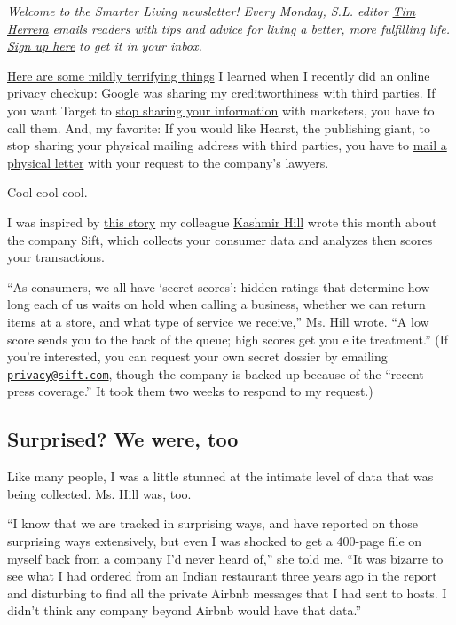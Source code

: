 \emph{Welcome to the Smarter Living newsletter! Every Monday, S.L.
editor} \href{https://twitter.com/timherrera}{\emph{Tim Herrera}}
\emph{emails readers with tips and advice for living a better, more
fulfilling life.}
\href{https://www.nytimes.com/newsletters/smarter-living?module=inline}{\emph{Sign
up here}} \emph{to get it in your inbox.}

\href{https://twitter.com/TimHerrera/status/1195067771463360512}{Here
are some mildly terrifying things} I learned when I recently did an
online privacy checkup: Google was sharing my creditworthiness with
third parties. If you want Target to
\href{https://twitter.com/TimHerrera/status/1195075728859156481}{stop
sharing your information} with marketers, you have to call them. And, my
favorite: If you would like Hearst, the publishing giant, to stop
sharing your physical mailing address with third parties, you have to
\href{https://twitter.com/TimHerrera/status/1195070845967851521}{mail a
physical letter} with your request to the company's lawyers.

Cool cool cool.

I was inspired by
\href{https://www.nytimes.com/2019/11/04/business/secret-consumer-score-access.html}{this
story} my colleague
\href{https://www.nytimes.com/by/kashmir-hill}{Kashmir Hill} wrote this
month about the company Sift, which collects your consumer data and
analyzes then scores your transactions.

``As consumers, we all have `secret scores': hidden ratings that
determine how long each of us waits on hold when calling a business,
whether we can return items at a store, and what type of service we
receive,'' Ms. Hill wrote. ``A low score sends you to the back of the
queue; high scores get you elite treatment.'' (If you're interested, you
can request your own secret dossier by emailing
\href{mailto:privacy@sift.com}{\nolinkurl{privacy@sift.com}}, though the
company is backed up because of the ``recent press coverage.'' It took
them two weeks to respond to my request.)

\hypertarget{surprised-we-were-too}{%
\subsection{Surprised? We were, too}\label{surprised-we-were-too}}

Like many people, I was a little stunned at the intimate level of data
that was being collected. Ms. Hill was, too.

``I know that we are tracked in surprising ways, and have reported on
those surprising ways extensively, but even I was shocked to get a
400-page file on myself back from a company I'd never heard of,'' she
told me. ``It was bizarre to see what I had ordered from an Indian
restaurant three years ago in the report and disturbing to find all the
private Airbnb messages that I had sent to hosts. I didn't think any
company beyond Airbnb would have that data.''

